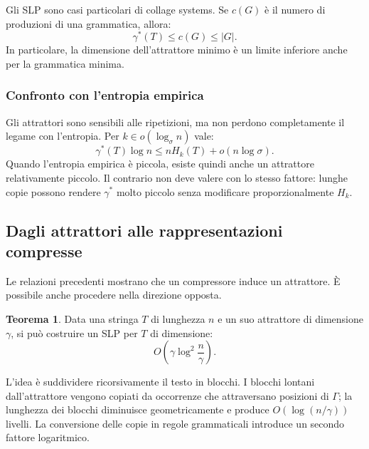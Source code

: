 \documentclass{article}
\theoremstyle{definition}
\newtheorem{theorem}{Teorema}[section] %
\numberwithin{equation}{section}
\begin{document}
Gli SLP sono casi particolari di collage systems. Se $c(G)$ è il numero di
produzioni di una grammatica, allora:
\begin{equation}\label{eq:gamma_grammar_relation}
    \gamma^*(T)\leq c(G)\leq |G|.
\end{equation}
In particolare, la dimensione dell'attrattore minimo è un limite inferiore
anche per la grammatica minima.

\subsubsection{Confronto con l'entropia empirica}
Gli attrattori sono sensibili alle ripetizioni, ma non perdono completamente il
legame con l'entropia. Per $k\in o(\log_{\sigma}n)$ vale:
\begin{equation}\label{eq:attractor_entropy_bound}
    \gamma^*(T)\log n
    \leq
    nH_k(T)+o(n\log\sigma).
\end{equation}
Quando l'entropia empirica è piccola, esiste quindi anche un attrattore
relativamente piccolo. Il contrario non deve valere con lo stesso fattore:
lunghe copie possono rendere $\gamma^*$ molto piccolo senza modificare
proporzionalmente $H_k$.

\subsection{Dagli attrattori alle rappresentazioni compresse}
Le relazioni precedenti mostrano che un compressore induce un attrattore. È
possibile anche procedere nella direzione opposta.

\begin{theorem}\label{theorem_attractor_to_slp}
    Data una stringa $T$ di lunghezza $n$ e un suo attrattore di dimensione
    $\gamma$, si può costruire un SLP per $T$ di dimensione:
    \begin{equation}\label{eq:attractor_to_slp_bound}
        O\left(
        \gamma
        \log^2\frac{n}{\gamma}
        \right).
    \end{equation}
\end{theorem}

L'idea è suddividere ricorsivamente il testo in blocchi. I blocchi lontani
dall'attrattore vengono copiati da occorrenze che attraversano posizioni di
$\Gamma$; la lunghezza dei blocchi diminuisce geometricamente e produce
$O(\log(n/\gamma))$ livelli. La conversione delle copie in regole grammaticali
introduce un secondo fattore logaritmico.
\end{document}
